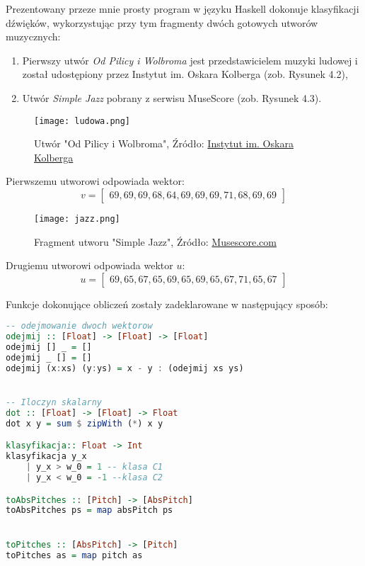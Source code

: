 Prezentowany przeze mnie prosty program w języku Haskell dokonuje klasyfikacji dźwięków, wykorzystując przy tym fragmenty dwóch gotowych utworów muzycznych: 

\begin{enumerate}
    \item Pierwszy utwór \textit{Od Pilicy i Wolbroma} jest przedstawicielem muzyki ludowej i został udostępiony przez Instytut im. Oskara Kolberga (zob. Rysunek 4.2),
    \item Utwór \textit{Simple Jazz} pobrany z serwisu MuseScore (zob. Rysunek 4.3).
\end{enumerate}


\begin{figure}[H]
\texttt{[image: ludowa.png]}
\centering
\caption{Utwór "Od Pilicy i Wolbroma", Źródło: \href{http://oskarkolberg.pl/pl-PL/MusicDb/Details/cafbb535-ed69-4b99-9002-f65fe40ed8fe}{Instytut im. Oskara Kolberga}}
\centering
\end{figure}

Pierwszemu utworowi odpowiada wektor:
\begin{equation*}
    v =
    \begin{bmatrix}
    69,69,69,68,64,69,69,69,71,68,69,69
    \end{bmatrix}
\end{equation*}

\begin{figure}[H]
\texttt{[image: jazz.png]}
\centering
\caption{Fragment utworu "Simple Jazz", Źródło: \href{https://musescore.com/user/27009977/scores/5429135}{Musescore.com}}
\centering
\end{figure}
Drugiemu utworowi odpowiada wektor $u$:
\begin{equation*}
u =
    \begin{bmatrix}
    69,65,67,65,69,65,69,65,67,71,65,67
    \end{bmatrix}
\end{equation*}

Funkcje dokonujące obliczeń zostały zadeklarowane w następujący sposób:
\begin{lstlisting}[language = Haskell]
-- odejmowanie dwoch wektorow
odejmij :: [Float] -> [Float] -> [Float]
odejmij [] _ = []
odejmij _ [] = []
odejmij (x:xs) (y:ys) = x - y : (odejmij xs ys)


-- Iloczyn skalarny
dot :: [Float] -> [Float] -> Float
dot x y = sum $ zipWith (*) x y

klasyfikacja:: Float -> Int
klasyfikacja y_x
    | y_x > w_0 = 1 -- klasa C1
    | y_x < w_0 = -1 --klasa C2

toAbsPitches :: [Pitch] -> [AbsPitch]
toAbsPitches ps = map absPitch ps


toPitches :: [AbsPitch] -> [Pitch]
toPitches as = map pitch as
\end{lstlisting}

